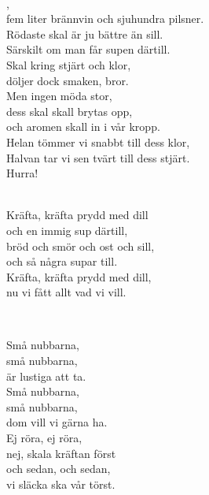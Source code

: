 
 \\       

,\\ 
fem liter brännvin och sjuhundra pilsner.\\ 
Rödaste skal är ju bättre än sill.\\ 
Särskilt om man får supen därtill.\\ 
Skal kring stjärt och klor,\\ 
döljer dock smaken, bror.\\ 
Men ingen möda stor,\\ 
dess skal skall brytas opp,\\ 
och aromen skall in i vår kropp.\\ 
Helan tömmer vi snabbt till dess klor,\\ 
Halvan tar vi sen tvärt till dess stjärt.\\ 
Hurra!\\ 


 \\       

\songtext{}
Kräfta, kräfta prydd med dill\\  
och en immig sup därtill,\\  
bröd och smör och ost och sill,\\  
och så några supar till.\\  
Kräfta, kräfta prydd med dill,\\  
nu vi fått allt vad vi vill.\\  

\newpage 


 \\       

\songtext{} 
Små nubbarna,\\ 
små nubbarna,\\ 
är lustiga att ta.\\ 
Små nubbarna,\\ 
små nubbarna,\\ 
dom vill vi gärna ha.\\ 
Ej röra, ej röra,\\ 
nej, skala kräftan först\\ 
och sedan, och sedan,\\ 
vi släcka ska vår törst.\\ 

